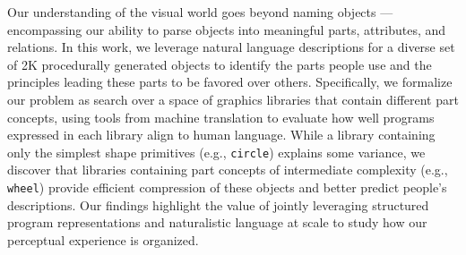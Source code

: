Our understanding of the visual world goes beyond naming objects --- encompassing our ability to parse objects into meaningful parts, attributes, and relations. 
In this work, we leverage natural language descriptions for a diverse set of 2K procedurally generated objects to identify the parts people use and the principles leading these parts to be favored over others.
Specifically, we formalize our problem as search over a space of graphics libraries that contain different part concepts, using tools from machine translation to evaluate how well programs expressed in each library align to human language.
While a library containing only the simplest shape primitives (e.g., \texttt{circle}) explains some variance, we discover that libraries containing part concepts of intermediate complexity (e.g., \texttt{wheel}) provide efficient compression of these objects and better predict people's descriptions.
Our findings highlight the value of jointly leveraging structured program representations and naturalistic language at scale to study how our perceptual experience is organized.



